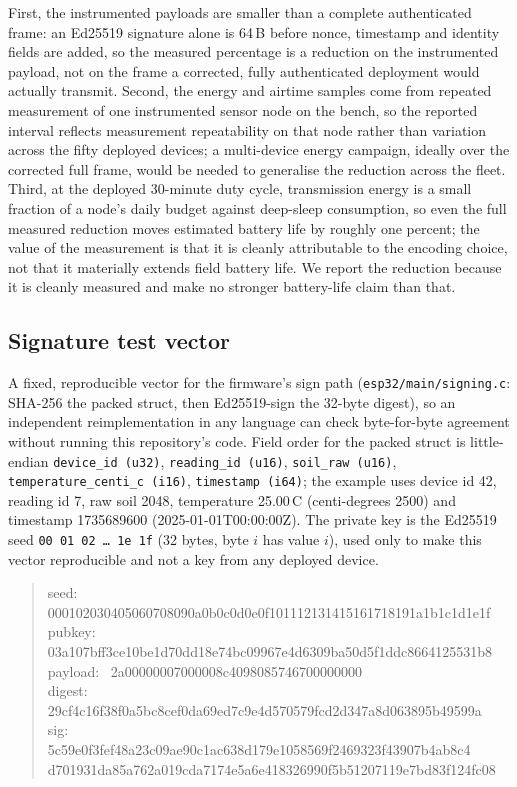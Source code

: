 First, the instrumented payloads are smaller than a complete authenticated
frame: an Ed25519 signature alone is 64\,B before nonce, timestamp and
identity fields are added, so the measured percentage is a reduction on the
instrumented payload, not on the frame a corrected, fully authenticated
deployment would actually transmit. Second, the energy and airtime samples
come from repeated measurement of one instrumented sensor node on the bench,
so the reported interval reflects measurement repeatability on that node
rather than variation across the fifty deployed devices; a multi-device
energy campaign, ideally over the corrected full frame, would be needed to
generalise the reduction across the fleet. Third, at the deployed
30-minute duty cycle, transmission energy is a small fraction of a node's
daily budget against deep-sleep consumption, so even the full measured
reduction moves estimated battery life by roughly one percent; the value of
the measurement is that it is cleanly attributable to the encoding choice,
not that it materially extends field battery life. We report the reduction
because it is cleanly measured and make no stronger battery-life claim than
that.

\subsection{Signature test vector}
\label{subsec:sig_vector}

A fixed, reproducible vector for the firmware's sign path
(\texttt{esp32/main/signing.c}: SHA-256 the packed struct, then Ed25519-sign
the 32-byte digest), so an independent reimplementation in any language can
check byte-for-byte agreement without running this repository's code.
Field order for the packed struct is little-endian
\texttt{device\_id~(u32)}, \texttt{reading\_id~(u16)},
\texttt{soil\_raw~(u16)}, \texttt{temperature\_centi\_c~(i16)},
\texttt{timestamp~(i64)}; the example uses device id 42, reading id 7, raw
soil 2048, temperature 25.00\,\textdegree{}C (centi-degrees 2500) and
timestamp 1735689600 (2025-01-01T00:00:00Z). The private key is the
Ed25519 seed \texttt{00 01 02 \ldots{} 1e 1f} (32 bytes, byte $i$ has value
$i$), used only to make this vector reproducible and not a key from any
deployed device.

\begin{quote}\small\ttfamily\raggedright
seed:~~~~ 000102030405060708090a0b0c0d0e0f101112131415161718191a1b1c1d1e1f\\
pubkey:~~ 03a107bff3ce10be1d70dd18e74bc09967e4d6309ba50d5f1ddc8664125531b8\\
payload:~ 2a00000007000008c4098085746700000000\\
digest:~~ 29cf4c16f38f0a5bc8cef0da69ed7c9e4d570579fcd2d347a8d063895b49599a\\
sig:~~~~~ 5c59e0f3fef48a23c09ae90c1ac638d179e1058569f2469323f43907b4ab8c4\\
\phantom{sig:~~~~~} d701931da85a762a019cda7174e5a6e418326990f5b51207119e7bd83f124fc08
\end{quote}

